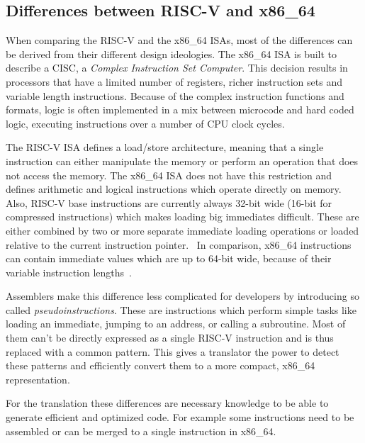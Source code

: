 \documentclass[course=eragp]{aspdoc}
\begin{document}
\subsection{Differences between RISC-V and x86\_64}

When comparing the RISC-V and the x86\_64 ISAs, most of the differences can be derived from their
different design ideologies. The x86\_64 ISA is built to describe a CISC, a \emph{Complex Instruction Set Computer}.
This decision results in processors that have a limited number of registers, richer instruction sets and variable length
instructions. Because of the complex instruction functions and formats, logic is often implemented
in a mix between microcode and hard coded logic, executing instructions over a number of CPU clock
cycles.~\cite{RISCvCISC}

\par

The RISC-V ISA defines a load/store architecture, meaning that a single instruction can either
manipulate the memory or perform an operation that does not access the memory. The x86\_64 ISA
does not have this restriction and defines arithmetic and logical instructions which operate
directly on memory. Also, RISC-V base instructions are currently always
32-bit wide (16-bit for compressed instructions) which makes loading big
immediates difficult. These are either combined by two or more separate immediate loading operations
or loaded relative to the current instruction pointer.~\cite{rvspec} In comparison, x86\_64 instructions
can contain immediate values which are up to 64-bit wide, because
of their variable instruction lengths~\cite{intel2017man}.

\par

Assemblers make this difference less complicated for developers by introducing so called
\textit{pseudoinstructions}. These are instructions which perform simple tasks like loading an
immediate, jumping to an address, or calling a subroutine. Most of them can't be directly expressed
as a single RISC-V instruction and is thus replaced with a common pattern. This gives a translator
the power to detect these patterns and efficiently convert them to a more compact, x86\_64 representation.

\par

For the translation these differences are necessary knowledge to be able to generate efficient and
optimized code. For example some instructions need to be assembled or can be merged to a single
instruction in x86\_64.
\end{document}
